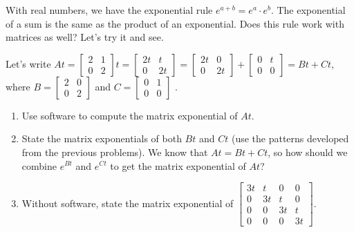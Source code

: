 With real numbers, we have the exponential rule $e^{a+b}=e^a\cdot e^b$.  The exponential of a sum is the same as the product of an exponential. Does this rule work with matrices as well?  Let's try it and see.


\begin{problem}
 Let's write 
$At=
\begin{bmatrix}
2 & 1\\
0 & 2
\end{bmatrix}t
=\begin{bmatrix}
2t & t\\
0 & 2t
\end{bmatrix}
=\begin{bmatrix}
2t & 0\\
0 & 2t
\end{bmatrix}
+
\begin{bmatrix}
0 & t\\
0 & 0
\end{bmatrix}
 = Bt+Ct$, 
where 
$B=
\begin{bmatrix}
2 & 0\\
0 & 2
\end{bmatrix}
$ and 
$C=
\begin{bmatrix}
0 & 1\\
0 & 0
\end{bmatrix}$
.
\begin{enumerate}
 \item {}%
Use software to compute the matrix exponential of $At$. 
 \item State the matrix exponentials of both $Bt$ and $Ct$ (use the patterns developed from the previous problems). We know that $At=Bt+Ct$, so how should we combine $e^{Bt}$ and $e^{Ct}$ to get the matrix exponential of $At$?
 \item Without software, state the matrix exponential of 
$
\begin{bmatrix}
3t& t &0&0\\
0 & 3t&t&0\\
0 & 0 &3t&t\\
0 & 0 &0&3t
\end{bmatrix}.
$
\end{enumerate}

\end{problem}










